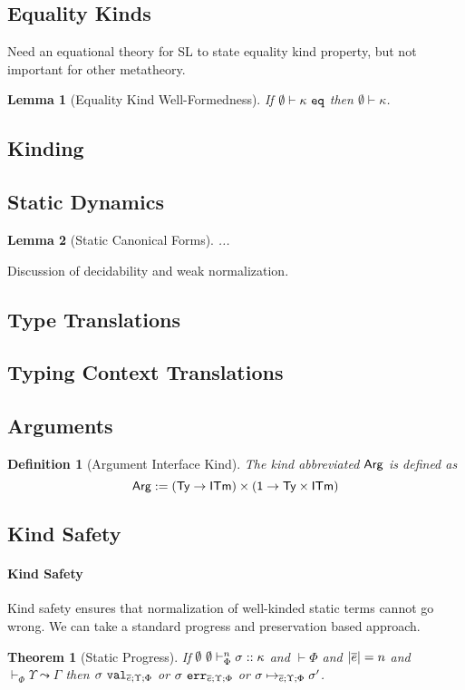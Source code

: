 \documentclass[12pt]{article}
\newtheorem{theorem}{Theorem}
\newtheorem{lemma}{Lemma}
\newtheorem{definition}{Definition}
\begin{document}
\subsection{Equality Kinds}
Need an equational theory for SL to state equality kind property, but not important for other metatheory. 

\begin{lemma}[Equality Kind Well-Formedness]
If $\emptyset \vdash \kappa~\mathtt{eq}$ then $\emptyset \vdash \kappa$. 
\end{lemma}

\subsection{Kinding}

\subsection{Static Dynamics}

\begin{lemma}[Static Canonical Forms]
...
\end{lemma}

Discussion of decidability and weak normalization.

\subsection{Type Translations}

\subsection{Typing Context Translations}

\subsection{Arguments}
\begin{definition}[Argument Interface Kind]
The kind abbreviated ${\sf Arg}$ is defined as\[{\sf Arg} := ({\sf Ty} \rightarrow {\sf ITm}) \times ({\sf 1} \rightarrow {\sf Ty}\times{\sf ITm})\]
\end{definition}

\subsection{Kind Safety}
\paragraph{Kind Safety} Kind safety ensures that normalization of well-kinded static terms cannot go wrong. We can take a standard progress and preservation based approach. 
\begin{theorem}[Static Progress]\label{thm:static-progress}
If $\emptyset~\emptyset \vdash_{\Phi}^{n} \sigma :: \kappa$ and $\vdash \Phi$ and $|\overline{e}|=n$ and $\vdash_\Phi \Upsilon \leadsto \Gamma$ then $\sigma~\mathtt{val}_{\overline{e}; \Upsilon; \Phi}$ or $\sigma~\mathtt{err}_{\overline{e}; \Upsilon; \Phi}$ or $\sigma \mapsto_{\overline{e}; \Upsilon; \Phi} \sigma'$.
\end{theorem}
\end{document}
